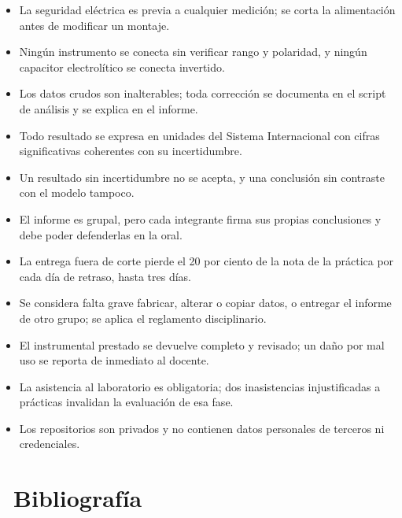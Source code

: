 \documentclass[11pt,a4paper]{article}
\newcommand{\iconotexto}[2]{\textcolor{cyanNeon}{\faIcon{#1}}~#2}
\begin{document}
\begin{itemize}[leftmargin=1.4em,itemsep=2pt,topsep=3pt]
  \item La seguridad eléctrica es previa a cualquier medición; se corta la alimentación antes de modificar un montaje.
  \item Ningún instrumento se conecta sin verificar rango y polaridad, y ningún capacitor electrolítico se conecta invertido.
  \item Los datos crudos son inalterables; toda corrección se documenta en el script de análisis y se explica en el informe.
  \item Todo resultado se expresa en unidades del Sistema Internacional con cifras significativas coherentes con su incertidumbre.
  \item Un resultado sin incertidumbre no se acepta, y una conclusión sin contraste con el modelo tampoco.
  \item El informe es grupal, pero cada integrante firma sus propias conclusiones y debe poder defenderlas en la oral.
  \item La entrega fuera de corte pierde el 20 por ciento de la nota de la práctica por cada día de retraso, hasta tres días.
  \item Se considera falta grave fabricar, alterar o copiar datos, o entregar el informe de otro grupo; se aplica el reglamento disciplinario.
  \item El instrumental prestado se devuelve completo y revisado; un daño por mal uso se reporta de inmediato al docente.
  \item La asistencia al laboratorio es obligatoria; dos inasistencias injustificadas a prácticas invalidan la evaluación de esa fase.
  \item Los repositorios son privados y no contienen datos personales de terceros ni credenciales.
\end{itemize}

\section{\iconotexto{book}{Bibliografía}}
\end{document}
